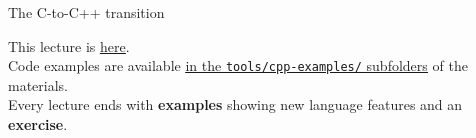 \begin{frame}{The C-to-C++ transition}
  \begin{block}{}
    \centering
    This lecture is \href{https://github.com/robmasocco/DAFN26_Robotics_2}{\color{blue}\underline{here}}.\\
    Code examples are available \href{https://github.com/IntelligentSystemsLabUTV/ros2-examples/tree/jazzy/tools/cpp-examples}{\color{blue}\underline{in the \texttt{tools/cpp-examples/} subfolders}} of the materials.\\
    Every lecture ends with \textbf{examples} showing new language features and an \textbf{exercise}.
  \end{block}
\end{frame}
